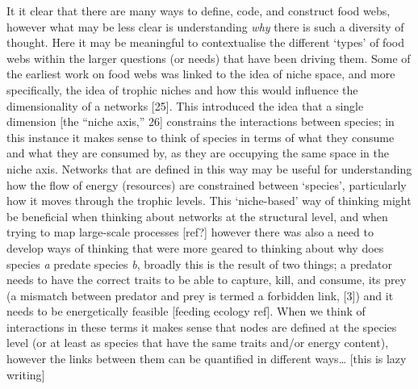 \documentclass[
]{article}
\begin{document}
It it clear that there are many ways to define, code, and construct food
webs, however what may be less clear is understanding \emph{why} there
is such a diversity of thought. Here it may be meaningful to
contextualise the different `types' of food webs within the larger
questions (or needs) that have been driving them. Some of the earliest
work on food webs was linked to the idea of niche space, and more
specifically, the idea of trophic niches and how this would influence
the dimensionality of a networks {[}25{]}. This introduced the idea that
a single dimension {[}the ``niche axis,'' 26{]} constrains the
interactions between species; in this instance it makes sense to think
of species in terms of what they consume and what they are consumed by,
as they are occupying the same space in the niche axis. Networks that
are defined in this way may be useful for understanding how the flow of
energy (resources) are constrained between `species', particularly how
it moves through the trophic levels. This `niche-based' way of thinking
might be beneficial when thinking about networks at the structural
level, and when trying to map large-scale processes {[}ref?{]} however
there was also a need to develop ways of thinking that were more geared
to thinking about why does species \emph{a} predate species \emph{b},
broadly this is the result of two things; a predator needs to have the
correct traits to be able to capture, kill, and consume, its prey (a
mismatch between predator and prey is termed a forbidden link, {[}3{]})
and it needs to be energetically feasible {[}feeding ecology ref{]}.
When we think of interactions in these terms it makes sense that nodes
are defined at the species level (or at least as species that have the
same traits and/or energy content), however the links between them can
be quantified in different ways\ldots{} {[}this is lazy writing{]}
\end{document}
